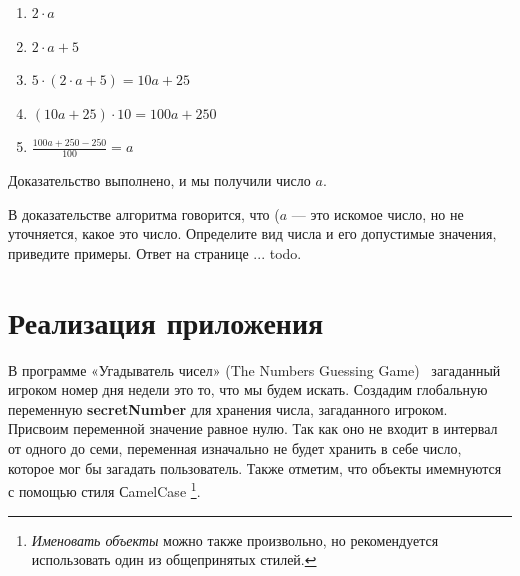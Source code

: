 \begin{enumerate}
   \item $2\cdot a $

   \item $2\cdot a + 5$

   \item $5\cdot(2 \cdot a  + 5) = 10 a + 25$
 
   \item $(10a + 25)\cdot 10 = 100  a + 250$
 
   \item  $\frac{100  a + 250 - 250}{100} =  a $
\end{enumerate}

Доказательство выполнено, и мы получили число $  a $.

\begin{mdfstyle}[nobreak=true,frametitle=Вопрос]
  \sloppy   
  В доказательстве алгоритма говорится, что ($  a $ — это искомое число, но не уточняется, какое это число. Определите вид числа и его допустимые значения, приведите примеры.  Ответ на странице ... todo.
  \label{question:text}
\end{mdfstyle}

\section{Реализация приложения}
\label{styles}
В программе «Угадыватель чисел» (The Numbers Guessing Game)~\cite{PanfilovaApp} загаданный игроком номер дня недели это то, что мы будем искать.
Создадим глобальную переменную  \textbf{secretNumber} для хранения числа, загаданного игроком. Присвоим переменной значение равное нулю. Так как оно не входит в интервал от одного до семи, переменная изначально не будет хранить в себе число, которое мог бы загадать пользователь. Также
отметим, что объекты имемнуются с помощью стиля СamelCase \footnote[][-0cm]{ \emph{Именовать объекты} 
можно также произвольно, но рекомендуется использовать один из общепринятых стилей.
}. 
